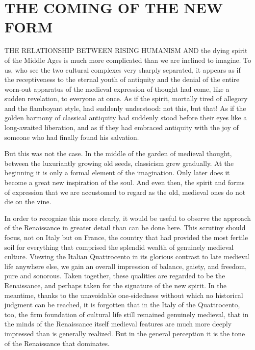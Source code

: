 \chapter{THE COMING OF THE NEW FORM}

THE RELATIONSHIP BETWEEN RISING HUMANISM AND the dying spirit of the
Middle Ages is much more complicated than we are inclined to imagine. To
us, who see the two cultural complexes very sharply separated, it
appears as if the receptiveness to the eternal youth of antiquity and
the denial of the entire worn-out apparatus of the medieval expression
of thought had come, like a sudden revelation, to everyone at once. As
if the spirit, mortally tired of allegory and the flamboyant style, had
suddenly understood: not this, but that! As if the golden harmony of
classical antiquity had suddenly stood before their eyes like a
long-awaited liberation, and as if they had embraced antiquity with the
joy of someone who had finally found his salvation.

But this was not the case. In the middle of the garden of medieval
thought, between the luxuriantly growing old seeds, classicism grew
gradually. At the beginning it is only a formal element of the
imagination. Only later does it become a great new inspiration of the
soul. And even then, the spirit and forms of expression that we are
accustomed to regard as the old, medieval ones do not die on the vine.

In order to recognize this more clearly, it would be useful to observe
the approach of the Renaissance in greater detail than can be done here.
This scrutiny should focus, not on Italy but on France, the country that
had provided the most fertile soil for everything that comprised the
splendid wealth of genuinely medieval culture. Viewing the Italian
Quattrocento in its glorious contrast to late medieval life anywhere
else, we gain an overall impression of balance, gaiety, and freedom,
pure and sonorous. Taken together, these qualities are regarded to be
the Renaissance, and perhaps taken for the signature of the new spirit.
In the meantime, thanks to the unavoidable one-sidedness without which
no historical judgment can be reached, it is forgotten that in the Italy
of the
\protect\hypertarget{22_Chapter_Fourteen__THE_COMING_OF.xhtmlux5cux23page_383}{}{}Quattrocento,
too, the firm foundation of cultural life still remained genuinely
medieval, that in the minds of the Renaissance itself medieval features
are much more deeply impressed than is generally realized. But in the
general perception it is the tone of the Renaissance that dominates.


